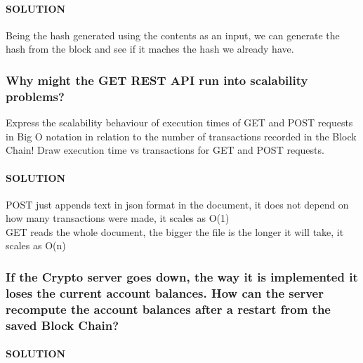 \documentclass[11pt]{article}
\begin{document}
    \hypertarget{solution}{%
\paragraph{SOLUTION}\label{solution}}

Being the hash generated using the contents as an input, we can generate
the hash from the block and see if it maches the hash we already have.

    \hypertarget{why-might-the-get-rest-api-run-into-scalability-problems}{%
\subsubsection{Why might the GET REST API run into scalability
problems?}\label{why-might-the-get-rest-api-run-into-scalability-problems}}

Express the scalability behaviour of execution times of GET and POST
requests in Big O notation in relation to the number of transactions
recorded in the Block Chain! Draw execution time vs transactions for GET
and POST requests.

    \hypertarget{solution}{%
\paragraph{SOLUTION}\label{solution}}

POST just appends text in json format in the document, it does not
depend on how many transactions were made, it scales as O(1)\\
GET reads the whole document, the bigger the file is the longer it will
take, it scales as O(n)

    \hypertarget{if-the-crypto-server-goes-down-the-way-it-is-implemented-it-loses-the-current-account-balances.-how-can-the-server-recompute-the-account-balances-after-a-restart-from-the-saved-block-chain}{%
\subsubsection{If the Crypto server goes down, the way it is
implemented it loses the current account balances. How can the server
recompute the account balances after a restart from the saved Block
Chain?}\label{if-the-crypto-server-goes-down-the-way-it-is-implemented-it-loses-the-current-account-balances.-how-can-the-server-recompute-the-account-balances-after-a-restart-from-the-saved-block-chain}}

    \hypertarget{solution}{%
\paragraph{SOLUTION}\label{solution}}
\end{document}

